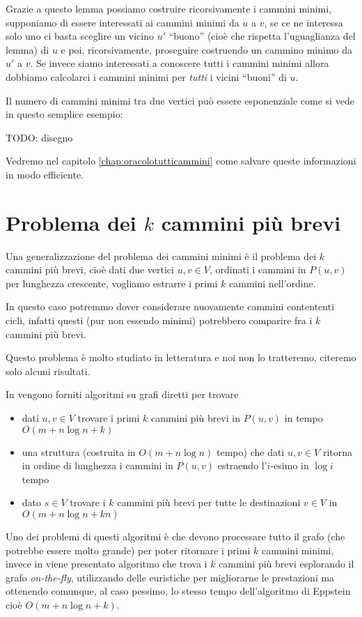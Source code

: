 \documentclass[a4paper,10pt]{amsbook}
\theoremstyle{plain}
\theoremstyle{definition}
\theoremstyle{remark}
\newcommand{\pa}[1]{\left(#1\right)}
\begin{document}
Grazie a questo lemma possiamo costruire ricorsivamente i cammini
minimi, supponiamo di essere interessati ai cammini minimi da $u$ a
$v$, se ce ne interessa solo uno ci basta sceglire un vicino $u'$
``buono'' (cioè che rispetta l'uguaglianza del lemma) di $u$ e poi,
ricorsivamente, proseguire costruendo un cammino minimo da $u'$ a
$v$. Se invece siamo interessati a conoscere tutti i cammini minimi
allora dobbiamo calcolarci i cammini minimi per \emph{tutti} i vicini
``buoni'' di $u$.

Il numero di cammini minimi tra due vertici può essere esponenziale
come si vede in questo semplice esempio:

TODO: disegno

Vedremo nel capitolo \ref{chap:oracolotutticammini} come salvare
queste informazioni in modo efficiente.

\section{Problema dei $k$ cammini più brevi}

Una generalizzazione del problema dei cammini minimi è il problema dei
$k$ cammini più brevi, cioè dati due vertici $u,v \in V$, ordinati i
cammini in $P(u,v)$ per lunghezza crescente, vogliamo estrarre i primi
$k$ cammini nell'ordine.

In questo caso potremmo dover considerare nuovamente cammini
contententi cicli, infatti questi (pur non essendo minimi) potrebbero
comparire fra i $k$ cammini più brevi.

Questo problema è molto studiato in letteratura e noi non lo
tratteremo, citeremo solo alcuni risultati.

In \cite{kshortest} vengono forniti algoritmi su grafi diretti per
trovare
\begin{itemize}
\item dati $u,v \in V$ trovare i primi $k$ cammini più brevi in
  $P\pa{u,v}$ in tempo $O\pa{m + n\log n + k}$
\item una struttura (costruita in $O\pa{m+n\log n}$ tempo) che dati
  $u,v\in V$ ritorna in ordine di lunghezza i cammini in $P(u,v)$
  estraendo l'$i$-esimo in $\log i$ tempo
\item dato $s\in V$ trovare i $k$ cammini più brevi per tutte le
  destinazioni $v\in V$ in $O\pa{m + n\log n + kn}$
\end{itemize}

Uno dei problemi di questi algoritmi è che devono processare tutto il
grafo (che potrebbe essere molto grande) per poter ritornare i primi
$k$ cammini minimi, invece in \cite{kspheur} viene presentato
algoritmo che trova i $k$ cammini più brevi esplorando il grafo
\textit{on-the-fly}, utilizzando delle euristiche per migliorarne le
prestazioni ma ottenendo comunque, al caso pessimo, lo stesso tempo
dell'algoritmo di Eppstein cioè $O\pa{m + n\log n + k}$.
\end{document}
